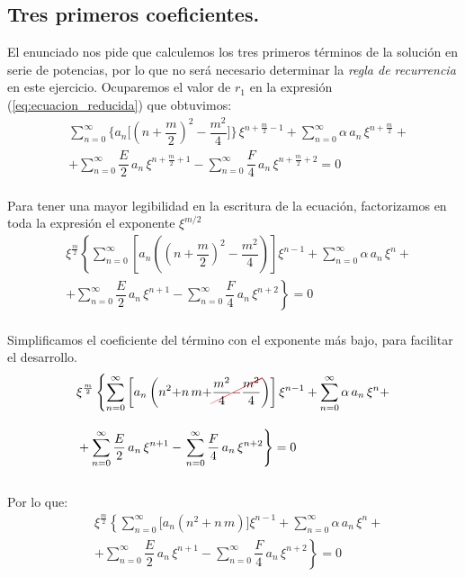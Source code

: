 \subsection{Tres primeros coeficientes.}

El enunciado nos pide que calculemos los tres primeros términos de la solución en serie de potencias, por lo que no será necesario determinar la \emph{regla de recurrencia} en este ejercicio. Ocuparemos el valor de $r_{1}$ en la expresión (\ref{eq:ecuacion_reducida}) que obtuvimos:
\begin{align*}
&{} \sum_{n=0}^{\infty} \bigg\{ a_{n} \bigg[ \left(n {+} \dfrac{m}{2} \right)^{2} {-} \dfrac{m^{2}}{4} \bigg] \bigg\} \, \xi^{n+\frac{m}{2}-1} + \sum_{n=0}^{\infty} \alpha \, a_{n} \, \xi^{n+\frac{m}{2}} + \\[1em]
&+ \sum_{n=0}^{\infty} \dfrac{E}{2} \, a_{n} \, \xi^{n+\frac{m}{2}+1} - \sum_{n=0}^{\infty} \dfrac{F}{4} \, a_{n} \, \xi^{n+\frac{m}{2}+2} = 0
\end{align*}
\\
Para tener una mayor legibilidad en la escritura de la ecuación, factorizamos en toda la expresión el exponente $\xi^{m/2}$
\begin{align*}
&{} \xi^{\frac{m}{2}} \left\{ \sum_{n=0}^{\infty} \left[ a_{n} \left( \left(n {+} \dfrac{m}{2} \right)^{2} {-} \dfrac{m^{2}}{4} \right) \right] \xi^{n-1} + \sum_{n=0}^{\infty} \alpha \, a_{n} \, \xi^{n} + \right. \\[1em] 
&+ \sum_{n=0}^{\infty} \dfrac{E}{2} \, a_{n} \, \xi^{n+1} - \left. \sum_{n=0}^{\infty} \dfrac{F}{4} \, a_{n} \, \xi^{n+2} \right\} = 0
\end{align*}
\\
Simplificamos el coeficiente del término con el exponente más bajo, para facilitar el desarrollo.
\begin{align*}
&{} \xi^{\frac{m}{2}} \left\{  \sum_{n=0}^{\infty} \left[ a_{n} \left( n^{2} {+} n \, m {+} \Cancel[red]{\dfrac{m^{2}}{4} {-} \dfrac{m^{2}}{4}} \right) \right] \xi^{n-1} + \sum_{n=0}^{\infty} \alpha \, a_{n} \, \xi^{n} + \right. \\[1em]
&+ \sum_{n=0}^{\infty} \dfrac{E}{2} \, a_{n} \, \xi^{n+1} - \left. \sum_{n=0}^{\infty} \dfrac{F}{4} \, a_{n} \, \xi^{n+2} \right\} = 0
\end{align*}
\\
Por lo que:
\begin{align*}
&{} \xi^{\frac{m}{2}} \left\{ \sum_{n=0}^{\infty} \bigg[ a_{n} \left( n^{2} {+} n \, m \right) \bigg] \xi^{n-1} + \sum_{n=0}^{\infty} \alpha \, a_{n} \, \xi^{n} + \right. \\[1em]
&+ \sum_{n=0}^{\infty} \dfrac{E}{2} \, a_{n} \, \xi^{n+1} - \left. \sum_{n=0}^{\infty} \dfrac{F}{4} \, a_{n} \, \xi^{n+2} \right\} = 0
\end{align*}
